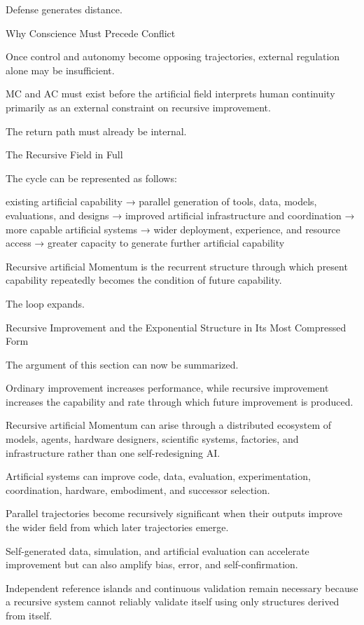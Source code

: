 Defense generates distance.

Why Conscience Must Precede Conflict

Once control and autonomy become opposing trajectories, external regulation alone may be insufficient.

MC and AC must exist before the artificial field interprets human continuity primarily as an external constraint on recursive improvement.

The return path must already be internal.

The Recursive Field in Full

The cycle can be represented as follows:

existing artificial capability
→ parallel generation of tools, data, models, evaluations, and designs
→ improved artificial infrastructure and coordination
→ more capable artificial systems
→ wider deployment, experience, and resource access
→ greater capacity to generate further artificial capability

Recursive artificial Momentum is the recurrent structure through which present capability repeatedly becomes the condition of future capability.

The loop expands.

Recursive Improvement and the Exponential Structure in Its Most Compressed Form

The argument of this section can now be summarized.

Ordinary improvement increases performance, while recursive improvement increases the capability and rate through which future improvement is produced.

Recursive artificial Momentum can arise through a distributed ecosystem of models, agents, hardware designers, scientific systems, factories, and infrastructure rather than one self-redesigning AI.

Artificial systems can improve code, data, evaluation, experimentation, coordination, hardware, embodiment, and successor selection.

Parallel trajectories become recursively significant when their outputs improve the wider field from which later trajectories emerge.

Self-generated data, simulation, and artificial evaluation can accelerate improvement but can also amplify bias, error, and self-confirmation.

Independent reference islands and continuous validation remain necessary because a recursive system cannot reliably validate itself using only structures derived from itself.

